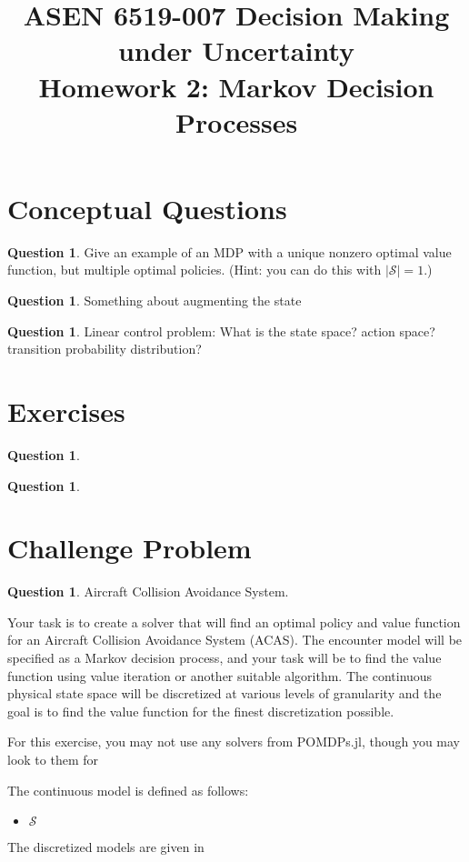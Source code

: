 \documentclass{article}
\title{ASEN 6519-007 Decision Making under Uncertainty\\
       Homework 2: Markov Decision Processes}
\theoremstyle{definition}
\newtheorem{question}[thm]{Question}
\begin{document}
\maketitle

\section{Conceptual Questions}

\begin{question}
    Give an example of an MDP with a unique nonzero optimal value function, but multiple optimal policies. (Hint: you can do this with $|\mathcal{S}| = 1$.)
\end{question}

\begin{question}
    Something about augmenting the state
\end{question}

\begin{question}
    Linear control problem: What is the state space? action space? transition probability distribution? 
\end{question}

\section{Exercises}

\begin{question}

\end{question}

\begin{question}

\end{question}

\section{Challenge Problem}

\begin{question}
Aircraft Collision Avoidance System.

Your task is to create a solver that will find an optimal policy and value function for an Aircraft Collision Avoidance System (ACAS). The encounter model will be specified as a Markov decision process, and your task will be to find the value function using value iteration or another suitable algorithm. The continuous physical state space will be discretized at various levels of granularity and the goal is to find the value function for the finest discretization possible.

For this exercise, you may not use any solvers from POMDPs.jl, though you may look to them for 

The continuous model is defined as follows:
\begin{itemize}
    \item $\mathcal{S}$
\end{itemize}

The discretized models are given in 

\end{question}
\end{document}
